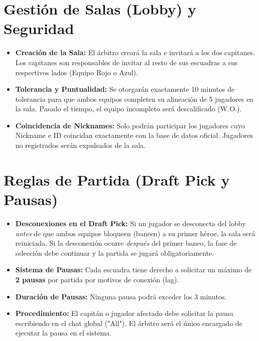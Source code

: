 \documentclass[11pt, a4paper]{article}
\begin{document}
\section{Gestión de Salas (Lobby) y Seguridad}
\begin{itemize}
    \item \textbf{Creación de la Sala:} El árbitro creará la sala e invitará a los dos capitanes. Los capitanes son responsables de invitar al resto de sus escuadras a sus respectivos lados (Equipo Rojo o Azul).
    \item \textbf{Tolerancia y Puntualidad:} Se otorgarán exactamente 10 minutos de tolerancia para que ambos equipos completen su alineación de 5 jugadores en la sala. Pasado el tiempo, el equipo incompleto será descalificado (W.O.).
    \item \textbf{Coincidencia de Nicknames:} Solo podrán participar los jugadores cuyo Nickname e ID coincidan exactamente con la base de datos oficial. Jugadores no registrados serán expulsados de la sala.
\end{itemize}

\section{Reglas de Partida (Draft Pick y Pausas)}
\begin{itemize}
    \item \textbf{Desconexiones en el Draft Pick:} Si un jugador se desconecta del lobby \textit{antes} de que ambos equipos bloqueen (baneen) a su primer héroe, la sala será reiniciada. Si la desconexión ocurre \textit{después} del primer baneo, la fase de selección debe continuar y la partida se jugará obligatoriamente.
    \item \textbf{Sistema de Pausas:} Cada escuadra tiene derecho a solicitar un máximo de \textbf{2 pausas} por partida por motivos de conexión (lag).
    \item \textbf{Duración de Pausas:} Ninguna pausa podrá exceder los 3 minutos.
    \item \textbf{Procedimiento:} El capitán o jugador afectado debe solicitar la pausa escribiendo en el chat global ("All"). El árbitro será el único encargado de ejecutar la pausa en el sistema.
\end{itemize}
\end{document}
